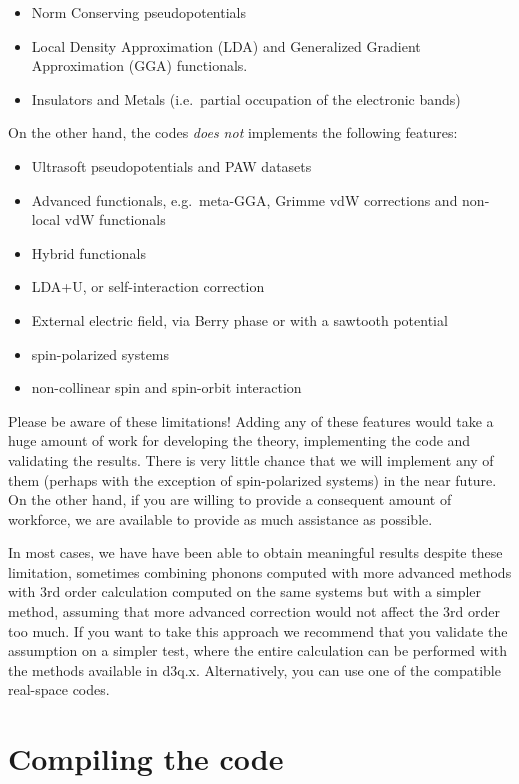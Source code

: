 \documentclass[
]{article}
\providecommand{\tightlist}{%
  \setlength{\itemsep}{0pt}\setlength{\parskip}{0pt}}
\begin{document}
\begin{itemize}
\tightlist
\item
  Norm Conserving pseudopotentials
\item
  Local Density Approximation (LDA) and Generalized Gradient
  Approximation (GGA) functionals.
\item
  Insulators and Metals (i.e.~partial occupation of the electronic
  bands)
\end{itemize}

On the other hand, the codes \emph{does not} implements the following
features:

\begin{itemize}
\tightlist
\item
  Ultrasoft pseudopotentials and PAW datasets
\item
  Advanced functionals, e.g.~meta-GGA, Grimme vdW corrections and
  non-local vdW functionals
\item
  Hybrid functionals
\item
  LDA+U, or self-interaction correction
\item
  External electric field, via Berry phase or with a sawtooth potential
\item
  spin-polarized systems
\item
  non-collinear spin and spin-orbit interaction
\end{itemize}

Please be aware of these limitations! Adding any of these features would
take a huge amount of work for developing the theory, implementing the
code and validating the results. There is very little chance that we
will implement any of them (perhaps with the exception of spin-polarized
systems) in the near future. On the other hand, if you are willing to
provide a consequent amount of workforce, we are available to provide as
much assistance as possible.

In most cases, we have have been able to obtain meaningful results
despite these limitation, sometimes combining phonons computed with more
advanced methods with 3rd order calculation computed on the same systems
but with a simpler method, assuming that more advanced correction would
not affect the 3rd order too much. If you want to take this approach we
recommend that you validate the assumption on a simpler test, where the
entire calculation can be performed with the methods available in d3q.x.
Alternatively, you can use one of the compatible real-space codes.

\hypertarget{compiling-the-code}{%
\section{Compiling the code}\label{compiling-the-code}}
\end{document}
